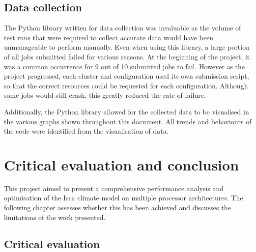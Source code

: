 \documentclass[a4paper,11pt]{report}
\begin{document}
\section{Data collection}
The Python library written for data collection was invaluable as the volume of test runs that were required to collect accurate data would have been unmanageable to perform manually. Even when using this library, a large portion of all jobs submitted failed for various reasons. At the beginning of the project, it was a common occurrence for 9 out of 10 submitted jobs to fail. However as the project progressed, each cluster and configuration used its own submission script, so that the correct resources could be requested for each configuration. Although some jobs would still crash, this greatly reduced the rate of failure.
\par
Additionally, the Python library allowed for the collected data to be visualised in the various graphs shown throughout this document. All trends and behaviours of the code were identified from the visualisation of data. 


\chapter{Critical evaluation and conclusion}
This project aimed to present a comprehensive performance analysis and optimisation of the Isca climate model on multiple processor architectures. The following chapter assesses whether this has been achieved and discusses the limitations of the work presented. 
\par

\section{Critical evaluation}
\end{document}
